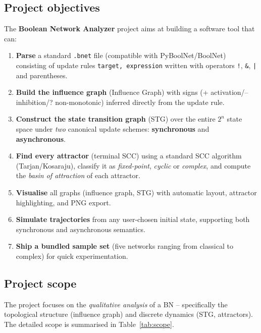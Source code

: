 \documentclass[oneside,final]{hcmut-report}
\begin{document}
\subsection{Project objectives}\label{subsec:objectives}

The \textbf{Boolean Network Analyzer} project aims at building a software tool that can:
\begin{enumerate}[leftmargin=*]
    \item \textbf{Parse} a standard \texttt{.bnet} file (compatible with PyBoolNet/BoolNet) consisting of update rules \texttt{target, expression} written with operators \texttt{!}, \texttt{\&}, \texttt{|} and parentheses.
    \item \textbf{Build the influence graph} (Influence Graph) with signs (+ activation/-- inhibition/? non-monotonic) inferred directly from the update rule.
    \item \textbf{Construct the state transition graph} (STG) over the entire $2^n$ state space under \textit{two} canonical update schemes: \textbf{synchronous} and \textbf{asynchronous}.
    \item \textbf{Find every attractor} (terminal SCC) using a standard SCC algorithm (Tarjan/Kosaraju), classify it as \textit{fixed-point}, \textit{cyclic} or \textit{complex}, and compute the \textit{basin of attraction} of each attractor.
    \item \textbf{Visualise} all graphs (influence graph, STG) with automatic layout, attractor highlighting, and PNG export.
    \item \textbf{Simulate trajectories} from any user-chosen initial state, supporting both synchronous and asynchronous semantics.
    \item \textbf{Ship a bundled sample set} (five networks ranging from classical to complex) for quick experimentation.
\end{enumerate}

\subsection{Project scope}\label{subsec:scope}

The project focuses on the \textit{qualitative analysis} of a BN -- specifically the topological structure (influence graph) and discrete dynamics (STG, attractors). The detailed scope is summarised in Table~\ref{tab:scope}.
\end{document}
